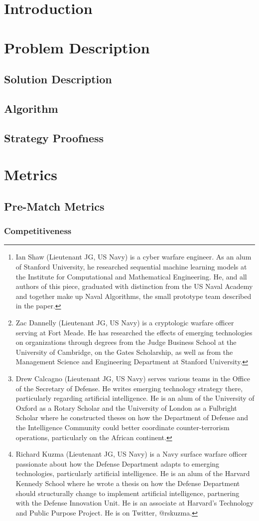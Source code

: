 \documentclass{article}
\title{\projectname}
\author{Ian Shaw, LTJG, USN \thanks{Ian Shaw (Lieutenant JG, US Navy) is a cyber warfare engineer. As an alum of Stanford University, he researched sequential machine learning models at the Institute for Computational and Mathematical Engineering. He, and all authors of this piece, graduated with distinction from the US Naval Academy and together make up Naval Algorithms, the small prototype team described in the paper. } 
\and Zac Dannelly, LTJG, USN \thanks{Zac Dannelly (Lieutenant JG, US Navy) is a cryptologic warfare officer serving at Fort Meade. He has researched the effects of emerging technologies on organizations through degrees from the Judge Business School at the University of Cambridge, on the Gates Scholarship, as well as from the Management Science and Engineering Department at Stanford University.}
\and Drew Calcagno, LTJG, USN \thanks{Drew Calcagno (Lieutenant JG, US Navy) serves various teams in the Office of the Secretary of Defense. He writes emerging technology strategy there, particularly regarding artificial intelligence. He is an alum of the University of Oxford as a Rotary Scholar and the University of London as a Fulbright Scholar where he constructed theses on how the Department of Defense and the Intelligence Community could better coordinate counter-terrorism operations, particularly on the African continent.} 
\and Richard Kuzma, LTJG, USN \thanks{Richard Kuzma (Lieutenant JG, US Navy) is a Navy surface warfare officer passionate about how the Defense Department adapts to emerging technologies, particularly artificial intelligence. He is an alum of the Harvard Kennedy School where he wrote a thesis on how the Defense Department should structurally change to implement artificial intelligence, partnering with the Defense Innovation Unit. He is an associate at Harvard’s Technology and Public Purpose Project. He is on Twitter, @rskuzma.}}
\begin{document}
\maketitle

\begin{abstract}

\end{abstract}

\newpage

\tableofcontents

\newpage

\section{Introduction}



\section{Problem Description}



\subsection{Solution Description}



\subsection{Algorithm}



\subsection{Strategy Proofness}



\section{Metrics}

\subsection{Pre-Match Metrics}

\subsubsection{Competitiveness}
\end{document}
